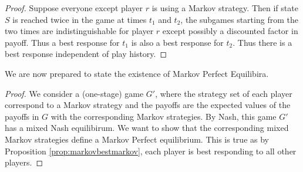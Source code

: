 \begin{proof}
    Suppose everyone except player $r$ is using a Markov strategy. Then if state $S$ is reached twice in the game at times $t_1$ and $t_2$, the subgames starting from the two times are indistinguishable for player $r$ except possibly a discounted factor in payoff. Thus a best response for $t_1$ is also a best response for $t_2$. Thus there is a best response independent of play history.
\end{proof}

We are now prepared to state the existence of Markov Perfect Equilibira.
\begin{proof}
    We consider a (one-stage) game $G'$, where the strategy set of each player correspond to a Markov strategy and the payoffs are the expected values of the payoffs in $G$ with the corresponding Markov strategies. By Nash, this game $G'$ has a mixed Nash equilibirum. We want to show that the corresponding mixed Markov strategies define a Markov Perfect equilibrium. This is true as by Proposition \ref{prop:markovbestmarkov}, each player is best responding to all other players.
\end{proof}

\example{

}